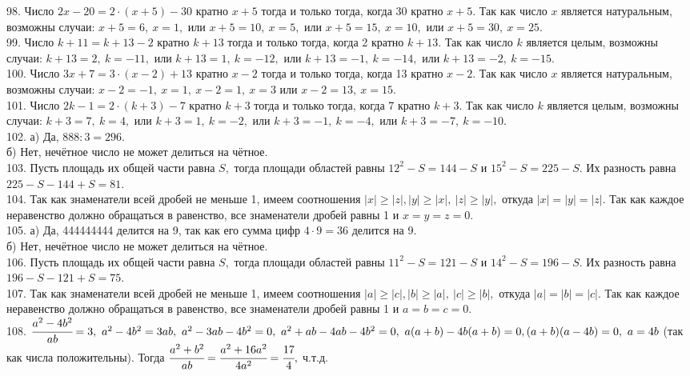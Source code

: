 \documentclass[12pt]{article}
\begin{document}
98. Число $2x-20=2\cdot(x+5)-30$ кратно $x+5$ тогда и только тогда, когда 30 кратно $x+5.$ Так как число $x$ является натуральным, возможны случаи: $x+5=6,\ x=1,$ или $x+5=10,\ x=5,$ или $x+5=15,\ x=10,$ или $x+5=30,\ x=25.$\\
99. Число $k+11=k+13-2$ кратно $k+13$ тогда и только тогда, когда 2 кратно $k+13.$ Так как число $k$ является целым, возможны случаи: $k+13=2,\ k=-11,$ или $k+13=1,\ k=-12,$ или $k+13=-1,\ k=-14,$ или $k+13=-2,\ k=-15.$\\
100. Число $3x+7=3\cdot(x-2)+13$ кратно $x-2$ тогда и только тогда, когда 13 кратно $x-2.$ Так как число $x$ является натуральным, возможны случаи: $x-2=-1,\ x=1,\ x-2=1,\ x=3$ или $x-2=13,\ x=15.$\\
101. Число $2k-1=2\cdot(k+3)-7$ кратно $k+3$ тогда и только тогда, когда 7 кратно $k+3.$ Так как число $k$ является целым, возможны случаи: $k+3=7,\ k=4,$ или $k+3=1,\ k=-2,$ или $k+3=-1,\ k=-4,$ или $k+3=-7,\ k=-10.$\\
102. а) Да, $888:3=296.$\\
б) Нет, нечётное число не может делиться на чётное.\\
103. Пусть площадь их общей части равна $S,$ тогда площади областей равны $12^2-S=144-S$ и $15^2-S=225-S.$ Их разность равна $225-S-144+S=81.$\\
104. Так как знаменатели всей дробей не меньше 1, имеем соотношения $|x|\geqslant |z|, |y|\geqslant |x|,\ |z|\geqslant |y|,$ откуда
$|x|=|y|=|z|.$ Так как каждое неравенство должно обращаться в равенство, все знаменатели дробей равны 1 и $x=y=z=0.$\\
105. а) Да, 444444444 делится на 9, так как его сумма цифр $4\cdot9=36$ делится на 9.\\
б) Нет, нечётное число не может делиться на чётное.\\
106. Пусть площадь их общей части равна $S,$ тогда площади областей равны $11^2-S=121-S$ и $14^2-S=196-S.$ Их разность равна $196-S-121+S=75.$\\
107. Так как знаменатели всей дробей не меньше 1, имеем соотношения $|a|\geqslant |c|, |b|\geqslant |a|,\ |c|\geqslant |b|,$ откуда
$|a|=|b|=|c|.$ Так как каждое неравенство должно обращаться в равенство, все знаменатели дробей равны 1 и $a=b=c=0.$\\
108. $\cfrac{a^2-4b^2}{ab}=3,\ a^2-4b^2=3ab,\ a^2-3ab-4b^2=0,\ a^2+ab-4ab-4b^2=0,\ a(a+b)-4b(a+b)=0, (a+b)(a-4b)=0,\ a=4b$ (так как числа положительны). Тогда
$\cfrac{a^2+b^2}{ab}=\cfrac{a^2+16a^2}{4a^2}=\cfrac{17}{4},$ ч.т.д.\\
\end{document}
